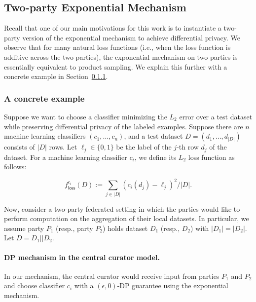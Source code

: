 \subsection{Two-party Exponential Mechanism}\label{sec:dp}
Recall that one of our main motivations for this work is to instantiate
a two-party version of the exponential mechanism to achieve differential
privacy.  We observe that for many natural loss functions (i.e., when
the loss function is additive across the two parties), the exponential
mechanism on two parties is essentially equivalent to product sampling.
We explain this further with a concrete example in
Section~\ref{sec:example}.  


\subsubsection{A concrete example}\label{sec:example}
Suppose we want to choose a classifier minimizing the $L_2$ error over a
test dataset while preserving differential privacy of the labeled
examples.  
%
Suppose there are $n$ machine learning classifiers $(c_1, \ldots, c_n)$,
and a test dataset $D = (d_1, \ldots, d_{|D|})$ consists of $|D|$ rows.
Let $\ell_j \in \{0,1\}$ be the label of the $j$-th row $d_j$ of the
dataset.
%
For a machine learning classifier $c_i$, we define its $L_2$ loss
function as follows: 

\[
f^{c_i}_{\mathsf{loss}}(D) := \sum_{j \in |D|}(c_i(d_j) - \ell_j)^2/|D|.
\]

Now, consider a two-party federated setting in which the parties would
like to perform computation on the aggregation of their local datasets.
In particular, we assume party $P_1$ (resp., party $P_2$) holds dataset
$D_1$ (resp., $D_2$) with $|D_1| = |D_2|$. Let $D = D_1 || D_2$.


\paragraph{DP mechanism in the central curator model.}
In our mechanism, the central curator would receive input from parties
$P_1$ and $P_2$ and choose classifier $c_i$ with a $(\epsilon, 0)$-DP
guarantee using the exponential mechanism. 

